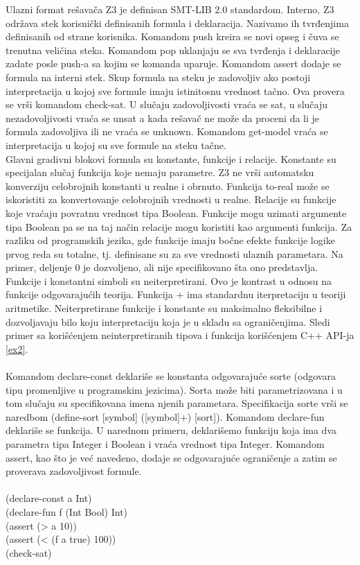 \documentclass[12pt,oneside]{memoir}
\begin{document}
Ulazni format rešavača Z3 je definisan SMT-LIB 2.0 standardom. Interno, Z3 održava stek korisnički definisanih formula i deklaracija. Nazivamo ih tvrđenjima definisanih od strane korisnika. Komandom push kreira se novi opseg i čuva se trenutna veličina steka. Komandom pop uklanjaju se sva tvrđenja i deklaracije zadate posle push-a sa kojim se komanda uparuje. Komandom assert dodaje se formula na interni stek. Skup formula na steku je zadovoljiv ako postoji interpretacija u kojoj sve formule imaju istinitosnu vrednost tačno. Ova provera se vrši komandom check-sat. U slučaju zadovoljivosti vraća se sat, u slučaju nezadovoljivosti vraća se unsat a kada rešavač ne može da proceni da li je formula zadovoljiva ili ne vraća se unknown. Komandom get-model vraća se interpretacija u kojoj su sve formule na steku tačne. 
\\

Glavni gradivni blokovi formula su konstante, funkcije i relacije. Konstante su specijalan slučaj funkcija koje nemaju parametre. Z3 ne vrši automatsku konverziju celobrojnih konstanti u realne i obrnuto. Funkcija to-real može se iskoristiti za konvertovanje celobrojnih vrednosti u realne. Relacije su funkcije koje vraćaju povratnu vrednost tipa Boolean. Funkcije mogu uzimati argumente tipa Boolean pa se na taj način relacije mogu koristiti kao argumenti funkcija. Za razliku od programskih jezika, gde funkcije imaju bočne efekte funkcije logike prvog reda su totalne, tj. definisane su za sve vrednosti ulaznih parametara. Na primer, deljenje 0 je dozvoljeno, ali nije specifikovano šta ono predstavlja. Funkcije i konstantni simboli su neiterpretirani. Ovo je kontrast u odnosu na funkcije odgovarajućih teorija. Funkcija + ima standardnu iterpretaciju u teoriji aritmetike. Neiterpretirane funkcije i konstante su maksimalno fleksibilne i dozvoljavaju bilo koju interpretaciju koja je u skladu sa ograničenjima. 
Sledi primer sa korišćenjem neinterpretiranih tipova i funkcija korišćenjem C++ API-ja \ref{ex2}. 
\\ \\


Komandom declare-const deklariše se konstanta odgovarajuće sorte (odgovara tipu promenljive u programskim jezicima). Sorta može biti parametrizovana i u tom slučaju su specifikovana imena njenih parametara. Specifikacija sorte vrši se naredbom (define-sort [symbol] ([symbol]+) [sort]).
Komandom declare-fun deklariše se funkcija. 
U narednom primeru, deklarišemo funkciju koja ima dva parametra tipa Integer i Boolean i vraća vrednost tipa Integer. Komandom assert, kao što je već navedeno, dodaje se odgovarajuće ograničenje a zatim se proverava zadovoljivost formule.
\\\\
(declare-const a Int)\\
(declare-fun f (Int Bool) Int)\\
(assert (> a 10))\\
(assert (< (f a true) 100))\\
(check-sat)\\
\\  
\end{document}
